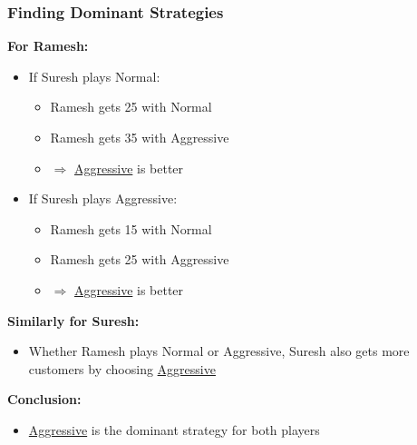 \begin{frame}[fragile]\frametitle{Finding Dominant Strategies}

\textbf{For Ramesh:}

\begin{itemize}
  \item If Suresh plays Normal:
  \begin{itemize}
    \item Ramesh gets 25 with Normal
    \item Ramesh gets 35 with Aggressive
    \item $\Rightarrow$ \underline{Aggressive} is better
  \end{itemize}

  \item If Suresh plays Aggressive:
  \begin{itemize}
    \item Ramesh gets 15 with Normal
    \item Ramesh gets 25 with Aggressive
    \item $\Rightarrow$ \underline{Aggressive} is better
  \end{itemize}
\end{itemize}

\vspace{6pt}

\textbf{Similarly for Suresh:}

\begin{itemize}
  \item Whether Ramesh plays Normal or Aggressive, Suresh also gets more customers by choosing \underline{Aggressive}
\end{itemize}

\vspace{8pt}

\textbf{Conclusion:}
\begin{itemize}
  \item \underline{Aggressive} is the dominant strategy for both players
\end{itemize}

\end{frame}

